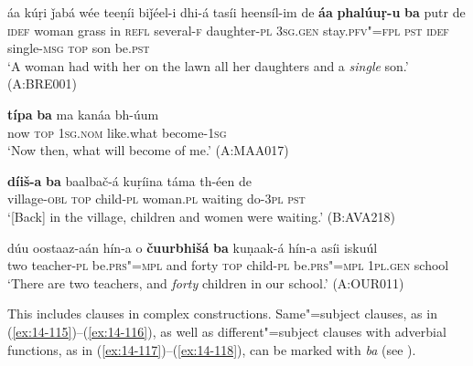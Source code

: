 \begin{exe}
\ex
\label{ex:14-111}
\gll áa kúṛi ǰabá wée teeṇíi biǰéel-i dhi-á  tasíi heensíl-im de \textbf{áa} \textbf{phalúuṛ-u} \textbf{ba} putr de\\
\textsc{idef} woman grass in \textsc{refl} several-\textsc{f} daughter-\textsc{pl} \textsc{3sg.gen} stay.\textsc{pfv"=fpl} \textsc{pst} \textsc{idef} single-\textsc{msg} \textsc{top} son be.\textsc{pst}\\
\glt `A woman had with her on the lawn all her daughters and a \textit{single} son.' (A:BRE001)

\ex
\label{ex:14-112}
\gll \textbf{típa} \textbf{ba} ma kanáa bh-úum \\
now \textsc{top} \textsc{1sg.nom} like.what become-\textsc{1sg } \\
\glt `Now then, what will become of me.' (A:MAA017)

\ex
\label{ex:14-113}
\gll \textbf{díiš-a} \textbf{ba} baalbač-á kuṛíina táma  th-éen de \\
village-\textsc{obl} \textsc{top} child-\textsc{pl} woman.\textsc{pl} waiting do-\textsc{3pl} \textsc{pst } \\
\glt `[Back] in the village, children and women were waiting.' (B:AVA218)

\ex
\label{ex:14-114}
\gll dúu oostaaz-aán hín-a o \textbf{čuurbhišá} \textbf{ ba} kuṇaak-á hín-a asíi iskuúl \\
two teacher-\textsc{pl} be.\textsc{prs"=mpl} and forty  \textsc{top} child-\textsc{pl} be.\textsc{prs"=mpl} \textsc{1pl.gen} school  \\
\glt `There are two teachers, and \textit{forty} children in our school.' (A:OUR011)
\end{exe}

This includes clauses in complex constructions. Same"=subject clauses, as in (\ref{ex:14-115})--(\ref{ex:14-116}), as well as different"=subject clauses with adverbial functions, as in (\ref{ex:14-117})--(\ref{ex:14-118}), can be marked with \textit{ba} (see ).

